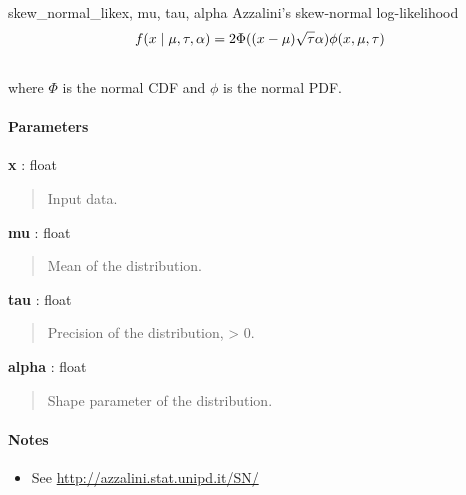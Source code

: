 \hypertarget{pymc.distributions.skew_normal_like}{}
\begin{funcdesc}{skew\_normal\_like}{x, mu, tau, alpha}
Azzalini's skew-normal log-likelihood
\begin{gather}
\begin{split}f(x \mid \mu, \tau, \alpha) = 2 \Phi((x-\mu)\sqrt{\tau}\alpha) \phi(x,\mu,\tau)\end{split}\notag\\\begin{split}\end{split}\notag
\end{gather}
where $\Phi$ is the normal CDF and $\phi$ is the normal PDF.

\paragraph{Parameters}\begin{paramlist}

\item[] \textbf{x} : float
\begin{quote}

Input data.
\end{quote}

\item[] \textbf{mu} : float
\begin{quote}

Mean of the distribution.
\end{quote}

\item[] \textbf{tau} : float
\begin{quote}

Precision of the distribution, \textgreater{} 0.
\end{quote}

\item[] \textbf{alpha} : float
\begin{quote}

Shape parameter of the distribution.
\end{quote}
\end{paramlist}
\paragraph{Notes}
\begin{itemize}
\item {} 
See \href{http://azzalini.stat.unipd.it/SN/}{http://azzalini.stat.unipd.it/SN/}

\end{itemize}
\end{funcdesc}

